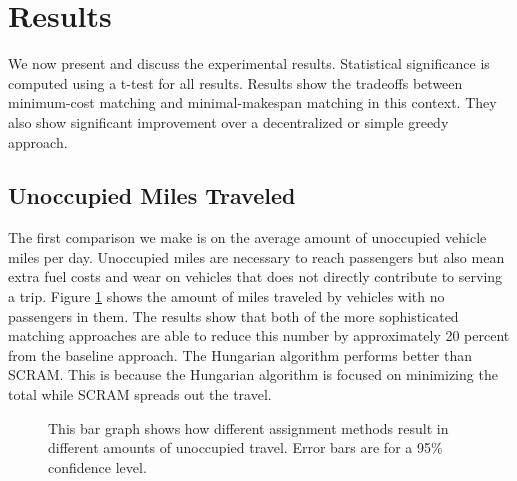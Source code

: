 \documentclass[letterpaper]{article}
\begin{document}
\section{Results}

We now present and discuss the experimental results. Statistical significance is computed using a t-test for all results. Results show the tradeoffs between minimum-cost matching and minimal-makespan matching in this context. They also show significant improvement over a decentralized or simple greedy approach.

\subsection{Unoccupied Miles Traveled}

The first comparison we make is on the average amount of unoccupied vehicle miles per day. Unoccupied miles are necessary to reach passengers but also mean extra fuel costs and wear on vehicles that does not directly contribute to serving a trip. Figure \ref{unoccupiedGraph} shows the amount of miles traveled by vehicles with no passengers in them. The results show that both of the more sophisticated matching approaches are able to reduce this number by approximately 20 percent from the baseline approach. The Hungarian algorithm performs better than SCRAM. This is because the Hungarian algorithm is focused on minimizing the total while SCRAM spreads out the travel.  

\begin{figure}
\caption{This bar graph shows how different assignment methods result in different amounts of unoccupied travel. Error bars are for a 95$\%$ confidence level.}
\label{unoccupiedGraph}
\end{figure}
\end{document}
